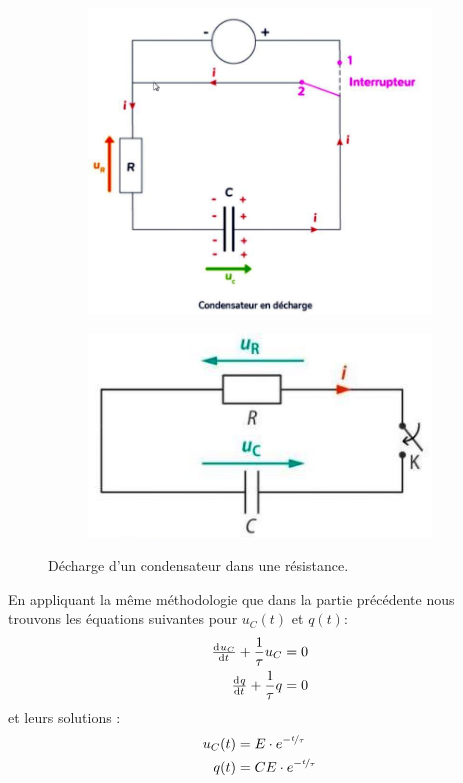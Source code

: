 \documentclass[11pt,a4paper]{article}
\begin{document}
\begin{figure}[H]
\centering
\begin{subfigure}{.55\textwidth}
  \centering
  \includegraphics[width=.95\linewidth]{imgs/p7/RCdecharge.jpg}  
\end{subfigure}
\begin{subfigure}{.4\textwidth}
  \centering
  \includegraphics[width=.95\linewidth]{imgs/p7/rcDecharg2.jpg}  
\end{subfigure}
\caption{Décharge d'un condensateur dans une résistance.}
\end{figure}

En appliquant la même méthodologie que dans la partie précédente nous trouvons les équations suivantes pour $u_C(t)$ et $q(t)$: 
\begin{align}
    \od{u_C}{t} + \frac{1}{\tau}u_C &= 0 \\
    \od{q}{t} + \frac{1}{\tau}q &= 0
\end{align}
et leurs solutions : 
\begin{align}
    u_C(t) &= E\cdot e^{-\nicefrac{t}{\tau}} \\
    q(t) &= CE\cdot e^{-\nicefrac{t}{\tau}}
\end{align}
\end{document}
